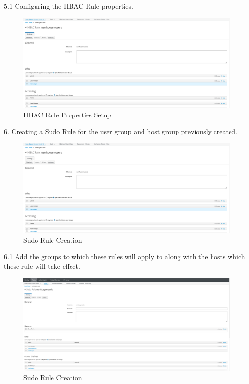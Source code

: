 5.1 Configuring the HBAC Rule properties.

\begin{figure}
    \includegraphics[width=12cm]{Images/Image24.png}
    \centering
    \caption{HBAC Rule Properties Setup}
\end{figure}

\vfill\eject

6. Creating a Sudo Rule for the user group and host group previously created. 

\begin{figure}
    \includegraphics[width=12cm]{Images/Image24.png}
    \centering
    \caption{Sudo Rule Creation}
\end{figure}


6.1 Add the groups to which these rules will apply to along with the hosts which these rule will take effect.

\begin{figure}
    \includegraphics[width=12cm]{Images/Image26.png}
    \centering
    \caption{Sudo Rule Creation}
\end{figure}

